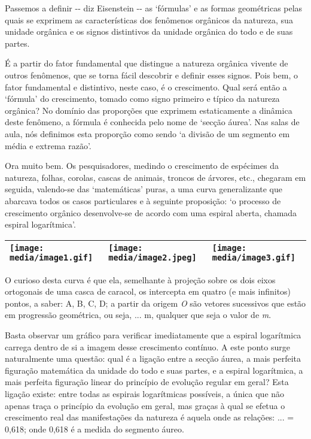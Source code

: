 Passemos a definir -\/- diz Eisenstein -\/- as `fórmulas' e as formas
geométricas pelas quais se exprimem as características dos fenômenos
orgânicos da natureza, sua unidade orgânica e os signos distintivos da
unidade orgânica do todo e de suas partes.

É a partir do fator fundamental que distingue a natureza orgânica
vivente de outros fenômenos, que se torna fácil descobrir e definir
esses signos. Pois bem, o fator fundamental e distintivo, neste caso, é
o crescimento. Qual será então a `fórmula' do crescimento, tomado como
signo primeiro e típico da natureza orgânica? No domínio das proporções
que exprimem estaticamente a dinâmica deste fenômeno, a fórmula é
conhecida pelo nome de `secção áurea'. Nas salas de aula, nós definimos
esta proporção como sendo `a divisão de um segmento em média e extrema
razão'.

Ora muito bem. Os pesquisadores, medindo o crescimento de espécimes da
natureza, folhas, corolas, cascas de animais, troncos de árvores, etc.,
chegaram em seguida, valendo-se das `matemáticas' puras, a uma curva
generalizante que abarcava todos os casos particulares e à seguinte
proposição: `o processo de crescimento orgânico desenvolve-se de acordo
com uma espiral aberta, chamada espiral logarítmica'.

\begin{longtable}[]{@{}lll@{}}
\toprule
\texttt{[image: media/image1.gif]} &
\texttt{[image: media/image2.jpeg]} &
\texttt{[image: media/image3.gif]}\tabularnewline
\bottomrule
\end{longtable}

O curioso desta curva é que ela, semelhante à projeção sobre os dois
eixos ortogonais de uma casca de caracol, os intercepta em quatro (e
mais infinitos) pontos, a saber: A, B, C, D; a partir da origem \emph{O}
são vetores sucessivos que estão em progressão geométrica, ou seja, ...
m, qualquer que seja o valor de \emph{m}.

Basta observar um gráfico para verificar imediatamente que a espiral
logarítmica carrega dentro de si a imagem desse crescimento contínuo. A
este ponto surge naturalmente uma questão: qual é a ligação entre a
secção áurea, a mais perfeita figuração matemática da unidade do todo e
suas partes, e a espiral logarítmica, a mais perfeita figuração linear
do princípio de evolução regular em geral? Esta ligação existe: entre
todas as espirais logarítmicas possíveis, a única que não apenas traça o
princípio da evolução em geral, mas graças à qual se efetua o
crescimento real das manifestações da natureza é aquela onde as
relações: ... = 0,618; onde 0,618 é a medida do segmento áureo.

